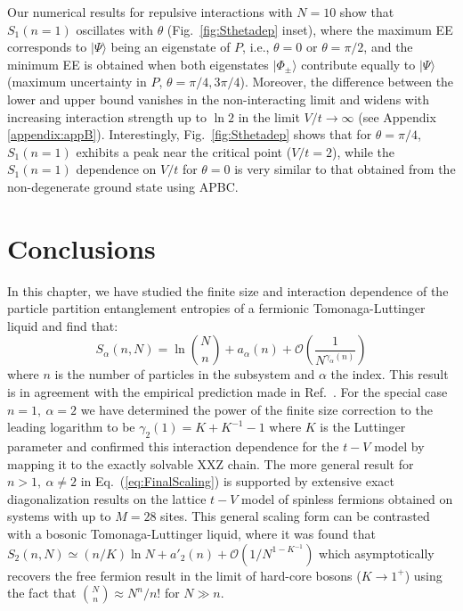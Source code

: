 %
Our numerical results for repulsive interactions with $N=10$ show that
$S_1(n=1)$ oscillates with $\theta$ (Fig.~\ref{fig:Sthetadep} inset), where the
maximum EE corresponds to $\vert \Psi\rangle$ being an eigenstate of $P$, i.e., $\theta=0$ or $\theta=\pi/2$, and the minimum EE is obtained when
both eigenstates $\vert\Phi_{\pm}\rangle$ contribute equally to $\vert
\Psi\rangle$ (maximum uncertainty in $P$, $\theta= \pi/4,3\pi/4$).  Moreover,
the difference between the lower and upper bound vanishes in the non-interacting limit and
widens with increasing interaction strength up to $\ln 2$ in the limit
$V/t\rightarrow \infty$ (see Appendix \ref{appendix:appB}). Interestingly, Fig.~\ref{fig:Sthetadep} shows
that for $\theta=\pi/4$, $S_1(n=1)$ exhibits a peak near the critical
point ($V/t=2$), while the $S_1(n=1)$  dependence on $V/t$ for $\theta=0$ is very
similar to that obtained from the non-degenerate ground state using APBC. 

%
\section{Conclusions}
%

In this chapter, we have studied the finite size and interaction
dependence of the particle partition \ren entanglement entropies of a fermionic
Tomonaga-Luttinger liquid and find that:
\begin{equation}
    S_\alpha(n,N) = \ln \binom{N}{n} + a_\alpha(n) +
    \mathcal{O}\left(\frac{1}{N^{\gamma_\alpha(n)}}\right)
\label{eq:FinalScaling}
\end{equation}
%
where $n$ is the number of particles in the subsystem and $\alpha$ the \ren
index.  This result is in agreement with the empirical prediction made in
Ref.~\cite{Zozulya:2007jw}.  For the special case $n=1,\ \alpha=2$ we have determined
the power of the finite size correction to the leading logarithm to be
$\gamma_2(1) = K + K^{-1} - 1$ where $K$ is the Luttinger parameter and
confirmed this interaction dependence for the $t-V$ model by mapping it to the
exactly solvable XXZ chain.  The more general result for $n>1,\ \alpha \ne 2$
in Eq.~(\ref{eq:FinalScaling}) is supported by extensive exact diagonalization
results on the lattice $t-V$ model of spinless fermions obtained on systems
with up to $M=28$ sites.  This general scaling form can be contrasted with a
bosonic Tomonaga-Luttinger liquid, where it was found \cite{Herdman:2015gx}
that $S_2(n,N) \simeq (n/K)\ln N + a'_2(n) + \mathcal{O}(1/N^{1-K^{-1}})$ which
asymptotically recovers the free fermion result in the limit of hard-core
bosons ($K\to 1^+$) using the fact that $\binom{N}{n} \approx N^n/n!$ for $N \gg
n$. 

